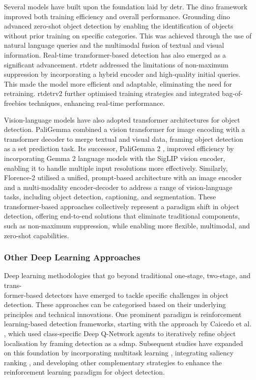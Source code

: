 Several models have built upon the foundation laid by \gls{detr}. The \gls{dino} framework \cite{zhang2022dino, li2022dn, liu2022dabdetr} improved both training efficiency and overall performance. Grounding \gls{dino} \cite{groundingdino} advanced zero-shot object detection by enabling the identification of objects without prior training on specific categories. This was achieved through the use of natural language queries and the multimodal fusion of textual and visual information.
Real-time transformer-based detection has also emerged as a significant advancement. \gls{rtdetr} \cite{rt-detr} addressed the limitations of non-maximum suppression by incorporating a hybrid encoder and high-quality initial queries. This made the model more efficient and adaptable, eliminating the need for retraining. \gls{rtdetr}v2 \cite{rt-detrv2} further optimised training strategies and integrated bag-of-freebies techniques, enhancing real-time performance.

Vision-language models have also adopted transformer architectures for object detection. PaliGemma \cite{paligemma} combined a vision transformer for image encoding with a transformer decoder to merge textual and visual data, framing object detection as a set prediction task. Its successor, PaliGemma 2 \cite{paligemma2}, improved efficiency by incorporating Gemma 2 language models with the SigLIP vision encoder, enabling it to handle multiple input resolutions more effectively. Similarly, Florence-2 \cite{florence2} utilised a unified, prompt-based architecture with an image encoder and a multi-modality encoder-decoder to address a range of vision-language tasks, including object detection, captioning, and segmentation.
These transformer-based approaches collectively represent a paradigm shift in object detection, offering end-to-end solutions that eliminate traditional components, such as non-maximum suppression, while enabling more flexible, multimodal, and zero-shot capabilities.

\subsubsection{Other Deep Learning Approaches}
\label{subsubsec:2_other_approaches}

Deep learning methodologies that go beyond traditional one-stage, two-stage, and trans-\\\noindent former-based detectors have emerged to tackle specific challenges in object detection. These approaches can be categorised based on their underlying principles and technical innovations.
One prominent paradigm is reinforcement learning-based detection frameworks, starting with the approach by Caicedo et al. \cite{Caicedo_2015_ICCV}, which used class-specific Deep Q-Network agents to iteratively refine object localisation by framing detection as a \gls{sdmp}. Subsequent studies have expanded on this foundation by incorporating multitask learning \cite{multitask_learning}, integrating saliency ranking \cite{bartolo2024integratingsaliencyrankingreinforcement}, and developing other complementary strategies \cite{reinforcenet, bar_rl} to enhance the reinforcement learning paradigm for object detection.

